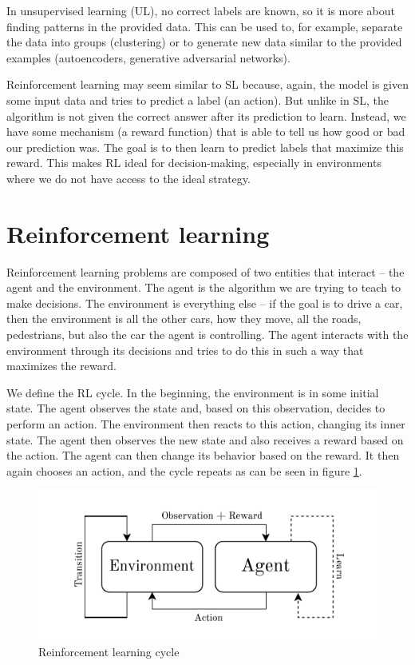 \documentclass[
  digital,     %
  oneside,     %
  nosansbold,  %
  nocolorbold, %
  lof,         %
  lot,         %
]{fithesis4}
\begin{document}
In unsupervised learning (UL), no correct labels are known, so it is more about finding patterns in the provided data. This can be used to, for example, separate the data into groups (clustering) or to generate new data similar to the provided examples (autoencoders, generative adversarial networks).

Reinforcement learning may seem similar to SL because, again, the model is given some input data and tries to predict a label (an action). But unlike in SL, the algorithm is not given the correct answer after its prediction to learn. Instead, we have some mechanism (a reward function) that is able to tell us how good or bad our prediction was. The goal is to then learn to predict labels that maximize this reward. This makes RL ideal for decision-making, especially in environments where we do not have access to the ideal strategy.

\section{Reinforcement learning}
Reinforcement learning problems are composed of two entities that interact -- the agent and the environment. The agent is the algorithm we are trying to teach to make decisions. The environment is everything else -- if the goal is to drive a car, then the environment is all the other cars, how they move, all the roads, pedestrians, but also the car the agent is controlling. The agent interacts with the environment through its decisions and tries to do this in such a way that maximizes the reward.

We define the RL cycle. In the beginning, the environment is in some initial state. The agent observes the state and, based on this observation, decides to perform an action. The environment then reacts to this action, changing its inner state. The agent then observes the new state and also receives a reward based on the action. The agent can then change its behavior based on the reward. It then again chooses an action, and the cycle repeats as can be seen in figure \ref{fig:rl-cycle}.

\begin{figure}
    \centering
    \includegraphics[width=1\linewidth]{diagrams/rl_cycle.pdf}
    \caption{Reinforcement learning cycle}
    \label{fig:rl-cycle}
\end{figure}
\end{document}
